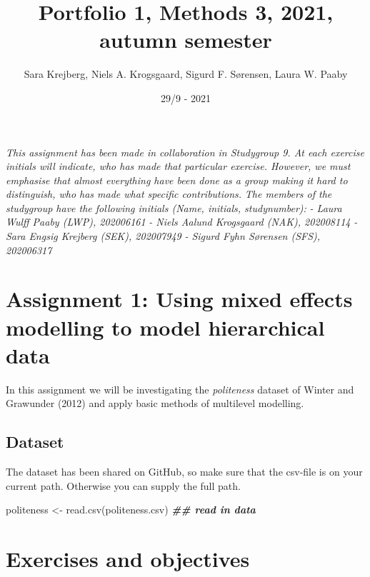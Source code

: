 \documentclass[
]{article}
\title{Portfolio 1, Methods 3, 2021, autumn semester}
\author{Sara Krejberg, Niels A. Krogsgaard, Sigurd F. Sørensen, Laura W.
Paaby}
\date{29/9 - 2021}
\newenvironment{Shaded}{\begin{snugshade}}{\end{snugshade}}
\newcommand{\DocumentationTok}[1]{\textcolor[rgb]{0.56,0.35,0.01}{\textbf{\textit{#1}}}}
\newcommand{\FunctionTok}[1]{\textcolor[rgb]{0.00,0.00,0.00}{#1}}
\newcommand{\NormalTok}[1]{#1}
\newcommand{\OtherTok}[1]{\textcolor[rgb]{0.56,0.35,0.01}{#1}}
\newcommand{\StringTok}[1]{\textcolor[rgb]{0.31,0.60,0.02}{#1}}
\begin{document}
\maketitle

\emph{This assignment has been made in collaboration in Studygroup 9. At
each exercise initials will indicate, who has made that particular
exercise. However, we must emphasise that almost everything have been
done as a group making it hard to distinguish, who has made what
specific contributions.} \emph{The members of the studygroup have the
following initials (Name, initials, studynumber):} \emph{- Laura Wulff
Paaby (LWP), 202006161} \emph{- Niels Aalund Krogsgaard (NAK),
202008114} \emph{- Sara Engsig Krejberg (SEK), 202007949} \emph{- Sigurd
Fyhn Sørensen (SFS), 202006317}

\hypertarget{assignment-1-using-mixed-effects-modelling-to-model-hierarchical-data}{%
\section{Assignment 1: Using mixed effects modelling to model
hierarchical
data}\label{assignment-1-using-mixed-effects-modelling-to-model-hierarchical-data}}

In this assignment we will be investigating the \emph{politeness}
dataset of Winter and Grawunder (2012) and apply basic methods of
multilevel modelling.

\hypertarget{dataset}{%
\subsection{Dataset}\label{dataset}}

The dataset has been shared on GitHub, so make sure that the csv-file is
on your current path. Otherwise you can supply the full path.

\begin{Shaded}
\begin{Highlighting}[]
\NormalTok{politeness }\OtherTok{\textless{}{-}} \FunctionTok{read.csv}\NormalTok{(}\StringTok{\textquotesingle{}politeness.csv\textquotesingle{}}\NormalTok{) }\DocumentationTok{\#\# read in data}
\end{Highlighting}
\end{Shaded}

\hypertarget{exercises-and-objectives}{%
\section{Exercises and objectives}\label{exercises-and-objectives}}
\end{document}
